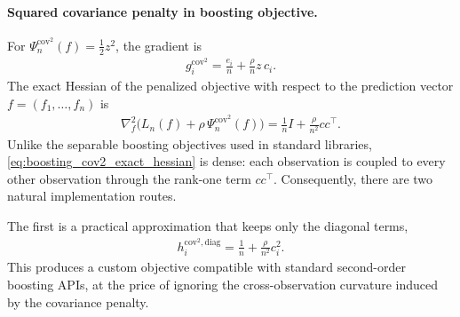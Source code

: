 \documentclass[12pt, draft]{article}
\theoremstyle{plain}
\theoremstyle{definition}
\newcommand{\1}{\mathbf{1}}
\begin{document}
{\paragraph{Squared covariance penalty in boosting objective.}
For \(\Psi_n^{\mathrm{cov}^2}(f)=\tfrac12 z^2\), the gradient is
\begin{align}
    \label{eq:boosting_cov2_gradient}
    g_i^{\mathrm{cov}^2}
    =
    \frac{e_i}{n}
    +
    \frac{\rho}{n}z\,c_i.
\end{align}
The exact Hessian of the penalized objective with respect to the prediction vector \(f=(f_1,\dots,f_n)\) is
\begin{align}
    \label{eq:boosting_cov2_exact_hessian}
    \nabla_f^2
    \bigl(L_n(f)+\rho\,\Psi_n^{\mathrm{cov}^2}(f)\bigr)
    =
    \frac{1}{n}I
    +
    \frac{\rho}{n^2}cc^\top.
\end{align}
Unlike the separable boosting objectives used in standard libraries, \eqref{eq:boosting_cov2_exact_hessian} is dense: each observation is coupled to every other observation through the rank-one term \(cc^\top\). Consequently, there are two natural implementation routes.

The first is a practical approximation that keeps only the diagonal terms,
\begin{align}
    \label{eq:boosting_cov2_diag_hessian}
    h_i^{\mathrm{cov}^2,\mathrm{diag}}
    =
    \frac{1}{n}
    +
    \frac{\rho}{n^2}c_i^2.
\end{align}
This produces a custom objective compatible with standard second-order boosting APIs, at the price of ignoring the cross-observation curvature induced by the covariance penalty.

}
\end{document}
